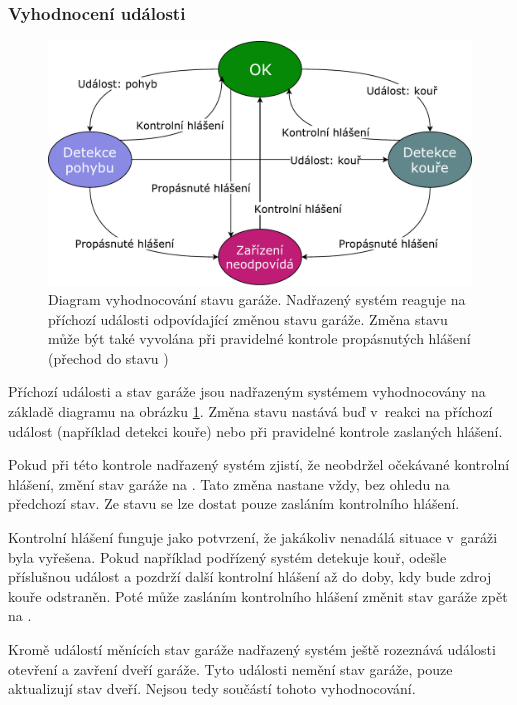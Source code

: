 \subsubsection{Vyhodnocení události}

\begin{figure}[h!]
    \centering
    \includegraphics[width=\textwidth]{images/garage_state.pdf}
    \caption[Diagram vyhodnocování stavu garáže]{Diagram vyhodnocování stavu garáže. Nadřazený systém reaguje na příchozí události odpovídající změnou stavu garáže. Změna stavu může být také vyvolána při pravidelné kontrole propásnutých hlášení (přechod do stavu )}
    \label{fig:garage_state}
\end{figure}

Příchozí události a stav garáže jsou nadřazeným systémem vyhodnocovány na základě diagramu na obrázku \ref{fig:garage_state}. Změna stavu nastává buď v~reakci na příchozí událost (například detekci kouře) nebo při pravidelné kontrole zaslaných hlášení. 

Pokud při této kontrole nadřazený systém zjistí, že neobdržel očekávané kontrolní hlášení, změní stav garáže na \textcolor{magenta}{}. Tato změna nastane vždy, bez ohledu na předchozí stav. Ze stavu \textcolor{magenta}{} se lze dostat pouze zasláním kontrolního hlášení.

Kontrolní hlášení funguje jako potvrzení, že jakákoliv nenadálá situace v~garáži byla vyřešena. Pokud například podřízený systém detekuje kouř, odešle příslušnou událost a pozdrží další kontrolní hlášení až do doby, kdy bude zdroj kouře odstraněn. Poté může zasláním kontrolního hlášení změnit stav garáže zpět na \textcolor{green}{}.

Kromě událostí měnících stav garáže nadřazený systém ještě rozeznává události otevření a zavření dveří garáže. Tyto události nemění stav garáže, pouze aktualizují stav dveří. Nejsou tedy součástí tohoto vyhodnocování.

